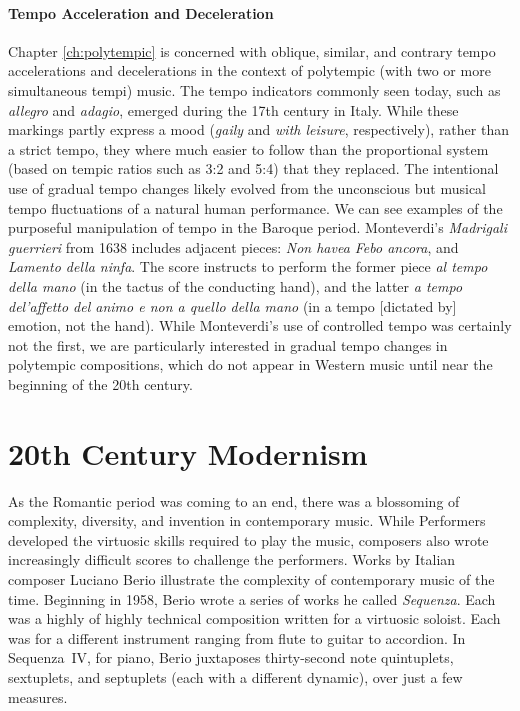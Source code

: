 \paragraph{Tempo Acceleration and Deceleration}
Chapter \ref{ch:polytempic}   is concerned with oblique, similar, and contrary
tempo accelerations and decelerations in the context of polytempic
(with two or more simultaneous tempi) music.  The tempo indicators
commonly seen today, such as \textit{allegro} and \textit{adagio}, emerged
during the 17th century in Italy. While these markings partly express
a mood (\textit{gaily} and \textit{with leisure}, respectively), rather
than a strict tempo, they where much easier to follow than the
proportional system (based on tempic ratios such as 3:2 and 5:4) that
they replaced.\cite{Sachs1953} The intentional use of gradual tempo
changes likely evolved from the unconscious but musical tempo
fluctuations of a natural human performance. We can see examples of
the purposeful manipulation of tempo in the Baroque
period. Monteverdi's \textit{Madrigali guerrieri} from 1638 includes
adjacent pieces: \textit{Non havea Febo ancora}, and \textit{Lamento
  della ninfa}. The score instructs to perform the former piece
\textit{al tempo della mano} (in the tactus of the conducting hand),
and the latter \textit{a tempo del'affetto del animo e non a quello
  della mano} (in a tempo [dictated by] emotion, not the hand).
While Monteverdi's use of controlled tempo was certainly not the
first, we are particularly interested in gradual tempo changes in
polytempic compositions, which do not appear in Western music until
near the beginning of the 20th century.


\section{20th Century Modernism}
\label{sec:modernism}
As the Romantic period was coming to an end, there was a blossoming of
complexity, diversity, and invention in contemporary music. While Performers
developed the virtuosic skills required to play the music, composers
also wrote increasingly difficult scores to challenge the
performers.\cite{Grout2006} Works by Italian composer Luciano Berio
illustrate the complexity of contemporary music of the time. Beginning
in 1958, Berio wrote a series of works he called
\textit{Sequenza}. Each was a highly of highly technical composition
written for a virtuosic soloist. Each was for a different instrument
ranging from flute to guitar to accordion.  In Sequenza~IV, for piano,
Berio juxtaposes thirty-second note quintuplets, sextuplets, and
septuplets (each with a different dynamic), over just a few
measures. 

